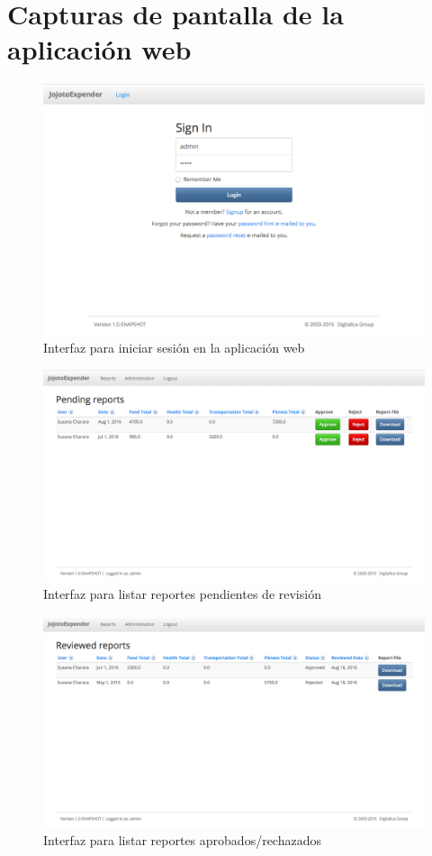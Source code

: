 \chapter{Capturas de pantalla de la aplicación web} \label{chap: Screenshots web}

\begin{figure}[ht]
  \centering
  \includegraphics[scale=0.45,type=png,ext=.png,read=.png]{imagenes/login_web}
  \captionsetup{justification=centering}
  \caption{Interfaz para iniciar sesión en la aplicación web}
  \label{fig:interfazLoginWeb}
\end{figure}

\begin{figure}[ht]
  \centering
  \includegraphics[scale=0.35,type=png,ext=.png,read=.png]{imagenes/pending_reports}
  \captionsetup{justification=centering}
  \caption{Interfaz para listar reportes pendientes de revisión}
  \label{fig:interfazListarReportesPendientesApendice}
\end{figure}

\begin{figure}[h]
  \centering
  \includegraphics[scale=0.35,type=png,ext=.png,read=.png]{imagenes/reviewed_reports}
  \captionsetup{justification=centering}
  \caption{Interfaz para listar reportes aprobados/rechazados}
  \label{fig:interfazListarReportesRevisadosApendice}
\end{figure}